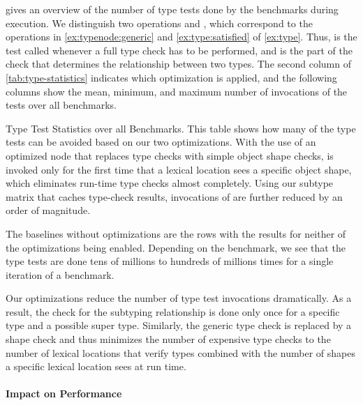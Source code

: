  gives an overview of the number of type tests done
by the benchmarks during execution.
We distinguish two operations  and ,
which correspond to the operations in
 \cref{ex:typenode:generic} and \cref{ex:type:satisfied} of \cref{ex:type}.
Thus,  is the test called
whenever a full type check has to be performed,
and  is the part of the check that
determines the relationship between two types.
The second column of \cref{tab:type-statistics} indicates
which optimization is applied,
and the following columns show the mean,
minimum, and maximum number of invocations of the tests
over all benchmarks.

\begin{table}[htb]
  \caption{Type Test Statistics over all Benchmarks.
  This table shows how many of the type tests can be avoided based on our two optimizations.
  With the use of an optimized node that replaces type checks with simple object shape checks,
   is invoked only for the first time that a lexical location
  sees a specific object shape, which eliminates run-time type checks almost completely.
  Using our subtype matrix that caches type-check results,
  invocations of  are further reduced by an order of magnitude.}
  \label{tab:type-statistics}

  \begin{center}
    \TypingStatsTable{}  
  \end{center}
\end{table}

The baselines without optimizations are the rows with the results
for neither of the optimizations being enabled.
Depending on the benchmark,
we see that the type tests
are done tens of millions
to hundreds of millions times
for a single iteration of a benchmark.

Our optimizations reduce the number of type test invocations dramatically.
As a result, the check for the subtyping relationship is done only once for 
a specific type and a possible super type.
Similarly, the generic type check is replaced by a shape check
and thus minimizes the number of expensive type checks
to the number of lexical locations that verify types
combined with the number of shapes a specific lexical
location sees at run time.

\paragraph*{Impact on Performance}

